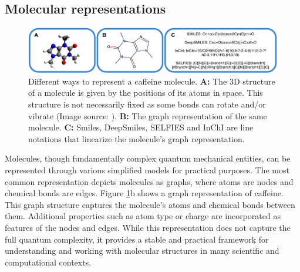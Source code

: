 \subsection{Molecular representations}
\begin{figure}
    \centering
    \includegraphics[width=\textwidth]{figures/representations/representations.pdf}
    \caption{Different ways to represent a caffeine molecule. \textbf{A:} The 3D structure of a
        molecule is given by the positions of its atoms in space. This structure is not
        necessarily fixed as some bonds can rotate and/or vibrate (Image source:
        \citep{Caffeine3DStructure2010}). \textbf{B:} The graph representation of the same
        molecule. \textbf{C:} Smiles, DeepSmiles, SELFIES and InChI are line notations that
        linearize the molecule's graph representation.\label{fig:molecular-graph}}
\end{figure}
Molecules, though fundamentally complex quantum mechanical entities, can be represented through
various simplified models for practical purposes. The most common representation depicts molecules
as graphs, where atoms are nodes and chemical bonds are edges. Figure \ref{fig:molecular-graph}b
shows a graph representation of caffeine. This graph structure captures the molecule's atoms
and chemical bonds between them. Additional properties such as atom type or charge are
incorporated as features of the nodes and edges. While this representation does not capture the full
quantum complexity, it provides a stable and practical framework for understanding and working with
molecular structures in many scientific and computational contexts.

